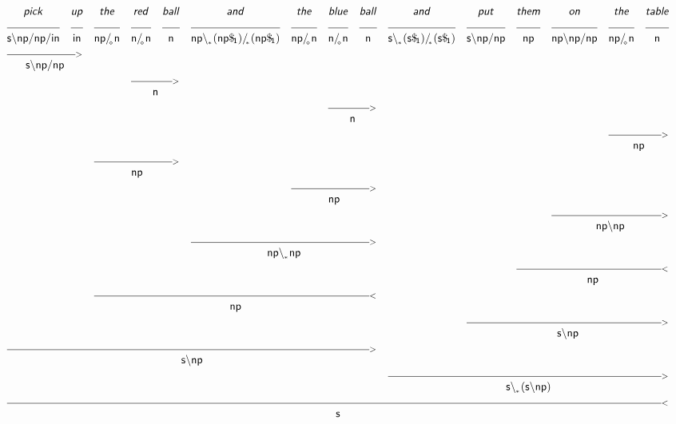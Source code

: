 \documentclass{article}
\newcommand{\deriv}[2]
{  \renewcommand{\arraystretch}{.5}
$\begin{array}[t]{*{#1}{c}}
     #2
   \end{array}$ }
\newcommand{\gf}[1]{\textsf{\textsl{#1}}}
\newcommand{\cf}[1]{\mbox{\ensuremath{\cfont{#1}}}}
\newcommand{\uline}[1]
{\mc{#1}{\hrulefill} }
\newcommand{\mc}[2]
  {\multicolumn{#1}{c}{#2}}
\newcommand{\cfont}{\mathsf}
\newcommand{\bs}{\backslash}
\newcommand{\subsa}[1]{\hspace{-0.75mm}_{_{#1}}}
\newcommand{\subsb}[1]{\hspace{-0.10mm}_{_{#1}}}
\newcommand{\subs}[1]{\hspace{-0.40mm}_{#1}}
\begin{document}
\deriv{15}{
\gf{pick} & \gf{up} & \gf{the} & \gf{red} & \gf{ball} & \gf{and} & \gf{the} & \gf{blue} & \gf{ball} & \gf{and} & \gf{put} & \gf{them} & \gf{on} & \gf{the} & \gf{table} \\
\uline{1} & \uline{1} & \uline{1} & \uline{1} & \uline{1} & \uline{1} & \uline{1} & \uline{1} & \uline{1} & \uline{1} & \uline{1} & \uline{1} & \uline{1} & \uline{1} & \uline{1} \\
\cf{s\bs np/ np/ in} & \cf{in} & \cf{np/ \subsa{\diamond} n} & \cf{n/ \subsa{\diamond} n} & \cf{n} & \cf{np\bs \subsb{*} (np\$ \subs{1})/ \subsa{*} (np\$ \subs{1})} & \cf{np/ \subsa{\diamond} n} & \cf{n/ \subsa{\diamond} n} & \cf{n} & \cf{s\bs \subsb{*} (s\$ \subs{1})/ \subsa{*} (s\$ \subs{1})} & \cf{s\bs np/ np} & \cf{np} & \cf{np\bs np/ np} & \cf{np/ \subsa{\diamond} n} & \cf{n} \\
 \mc{2} {\hrulefill_{>}} \\
 \mc{2}{\cf{s\bs np/ np}} \\
&&& \mc{2} {\hrulefill_{>}} \\
&&& \mc{2}{\cf{n}} \\
&&&&&&& \mc{2} {\hrulefill_{>}} \\
&&&&&&& \mc{2}{\cf{n}} \\
&&&&&&&&&&&&& \mc{2} {\hrulefill_{>}} \\
&&&&&&&&&&&&& \mc{2}{\cf{np}} \\
&& \mc{3} {\hrulefill_{>}} \\
&& \mc{3}{\cf{np}} \\
&&&&&& \mc{3} {\hrulefill_{>}} \\
&&&&&& \mc{3}{\cf{np}} \\
&&&&&&&&&&&& \mc{3} {\hrulefill_{>}} \\
&&&&&&&&&&&& \mc{3}{\cf{np\bs np}} \\
&&&&& \mc{4} {\hrulefill_{>}} \\
&&&&& \mc{4}{\cf{np\bs \subsb{*} np}} \\
&&&&&&&&&&& \mc{4} {\hrulefill_{<}} \\
&&&&&&&&&&& \mc{4}{\cf{np}} \\
&& \mc{7} {\hrulefill_{<}} \\
&& \mc{7}{\cf{np}} \\
&&&&&&&&&& \mc{5} {\hrulefill_{>}} \\
&&&&&&&&&& \mc{5}{\cf{s\bs np}} \\
 \mc{9} {\hrulefill_{>}} \\
 \mc{9}{\cf{s\bs np}} \\
&&&&&&&&& \mc{6} {\hrulefill_{>}} \\
&&&&&&&&& \mc{6}{\cf{s\bs \subsb{*} (s\bs np)}} \\
 \mc{15} {\hrulefill_{<}} \\
 \mc{15}{\cf{s}} \\
}
\end{document}
